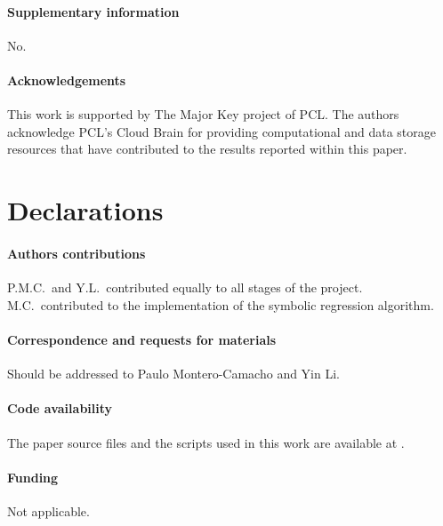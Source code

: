 \paragraph{\large Supplementary information} No.

\paragraph{\large Acknowledgements}
This work is supported by The Major Key project of PCL.
The authors acknowledge PCL's Cloud Brain for providing computational
and data storage resources that have contributed to the results reported
within this paper.

\section*{Declarations}

\paragraph{\large Authors contributions}
P.M.C.\ and Y.L.\ contributed equally to all stages of the project.
M.C.\ contributed to the implementation of the symbolic regression
algorithm.

\vspace{-1em}
\paragraph{\large Correspondence and requests for materials}
Should be addressed to Paulo Montero-Camacho and Yin Li.

\vspace{-1em}
\paragraph{\large Code availability}
The paper source files and the scripts used in this work are available
at \href{https://github.com/eelregit/5par}{\faGithub}.

\vspace{-1em}
\paragraph{\large Funding}
Not applicable.

\vspace{-1em}
